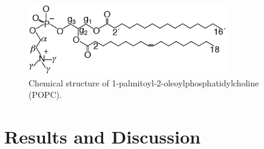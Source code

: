 \documentclass[pre,aps,floatfix,authordate1-4,twocolumn]{revtex4-1}
\begin{document}
\begin{figure}[]
  \centering
  \includegraphics[width=8.6cm]{../Fig/POPCstructure.eps}

  \caption{\label{POPCstructure}
    Chemical structure of 1-palmitoyl-2-oleoylphosphatidylcholine (POPC).}
  
\end{figure}





\section{Results and Discussion}
\end{document}
